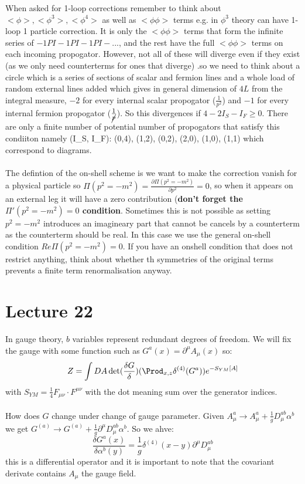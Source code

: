 \documentclass{article}
\begin{document}
       When asked for 1-loop corrections remember to think about $<\phi>,<\phi^3>, <\phi^4>$ as well as $<\phi \phi>$ terms e.g. in $\phi^3$ theory can have 1-loop 1 particle correction. It is only the $<\phi \phi>$ terms that form the infinite series of $-1PI-1PI-1PI-...$, and the rest have the full $<\phi \phi>$ terms on each incoming propogator. However, not all of these will diverge even if they exist (as we only need counterterms for ones that diverge) .so we need to think about a circle which is a series of sections of scalar and fermion lines and a whole load  of random external lines added which gives in general dimension of $4L$ from the integral measure, $-2$ for every internal scalar propogator ($\frac{1}{p^2}$) and $-1$ for every internal fermion propogator ($\frac{1}{\cancel p}$). So this divergences if $4 -2I_S - I_F \geq 0$. There are only a finite number of potential number of propogators that satisfy this condiiton namely (I_S, I_F): (0,4), (1,2), (0,2), (2,0), (1,0), (1,1) which correspond to diagrams.\\\\
       The defintion of the on-shell scheme is we want to make the correction vanish for a physical particle so $\Pi( p^2 = - m^2)= \frac{\partial \Pi( p^2 = -m^2)}{\partial p^2} = 0$, so when it appears on an external leg it will have a zero contribution (\textbf{don't forget the $\Pi'(p^2 =-m^2) = 0$ condition}. Sometimes this is not possible as setting $p^2 = -m^2$ introduces an imagineary part that cannot be cancels by a counterterm as the counterterm should be real. In this case we use the general on-shell condition $Re \Pi(p^2 = -m^2) = 0$. If you have an onshell condition that does not restrict anything, think about whether th symmetries of the original terms prevents a finite term renormalisation anyway.
       \section{Lecture 22}
       In gauge theory, $b$ variables represent redundant degrees of freedom. We will fix the gauge with some function such as $G^a( x) = \partial^{\mu} A_{\mu} (x)$ so:
       $$
       Z= \int DA \det ( \frac{\delta G}{\delta }) ( \Prod_{x,z} \delta^{(4)}(G^a)) e^{ - S_{YM} [A]}
       $$
       with $S_{YM} = \frac{1}{4} F_{\mu \nu} \cdot F^{\mu \nu}$ with the dot meaning sum over the generator indices.\\\\
       How does $G$ change under change of gauge parameter. Given $A_{\mu}^a \rightarrow A_{\mu}^a + \frac{1}{g} D_{\mu}^{ab} \alpha^b$ we get $G^{(a)} \rightarrow G^{(a)} + \frac{1}{g} \partial^{\mu} D_{\mu}^{ab} \alpha^b$. So we ahve:
       $$
        \frac{\delta G^a (x)}{\delta \alpha^b (y)} = \frac{1}{g} \delta^{(4)}(x-y) \partial^{\mu} D_{\mu}^{ab} 
       $$
       this is a differential operator and it is important to note that the covariant derivate contains $A_{\mu}$ the gauge field.
\end{document}
